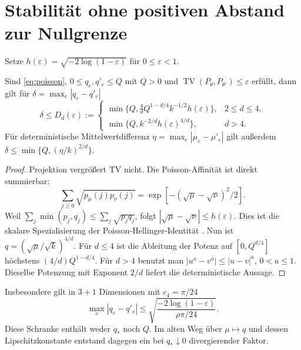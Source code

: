 \documentclass[11pt,a4paper]{article}
\newcommand{\TV}{\operatorname{TV}}\newcommand{\Pois}{\operatorname{Pois}}
\begin{document}
\section{Stabilität ohne positiven Abstand zur Nullgrenze}
Setze $h(\varepsilon)=\sqrt{-2\log(1-\varepsilon)}$ für $0\leq\varepsilon<1$.
\begin{lemma}\label{lem:null}
Sind \eqref{eq:poisson}, $0\leq q_e,q'_e\leq Q$ mit $Q>0$ und $\TV(P_\theta,P_{\theta'})\leq\varepsilon$ erfüllt, dann gilt für $\delta=\max_e|q_e-q'_e|$
\begin{equation}\label{eq:newD}
 \delta\leq D_d(\varepsilon):=
 \begin{cases}
 \min\{Q,\frac4d Q^{1-d/4}k^{-1/2}h(\varepsilon)\},&2\leq d\leq4,\\
 \min\{Q,k^{-2/d}h(\varepsilon)^{4/d}\},&d>4.
 \end{cases}
\end{equation}
Für deterministische Mittelwertdifferenz $\eta=\max_e|\mu_e-\mu'_e|$ gilt außerdem $\delta\leq\min\{Q,(\eta/k)^{2/d}\}$.
\end{lemma}
\begin{proof}
Projektion vergrößert TV nicht. Die Poisson-Affinität ist direkt summierbar:
\[
 \sum_{j\geq0}\sqrt{p_\mu(j)p_\nu(j)}
 =\exp[-(\sqrt\mu-\sqrt\nu)^2/2].
\]
Weil $\sum_j\min(p_j,q_j)\leq\sum_j\sqrt{p_jq_j}$, folgt $|\sqrt\mu-\sqrt\nu|\leq h(\varepsilon)$. Dies ist die skalare Spezialisierung der Poisson-Hellinger-Identität \cite{leskela}. Nun ist $q=(\sqrt\mu/\sqrt{k})^{4/d}$. Für $d\leq4$ ist die Ableitung der Potenz auf $[0,Q^{d/4}]$ höchstens $(4/d)Q^{1-d/4}$. Für $d>4$ benutzt man $|u^a-v^a|\leq|u-v|^a$, $0<a\leq1$. Dieselbe Potenzung mit Exponent $2/d$ liefert die deterministische Aussage.
\end{proof}

Insbesondere gilt in $3+1$ Dimensionen mit $c_4=\pi/24$
\begin{equation}\label{eq:4D}
 \max_e|q_e-q'_e|\leq\sqrt{\frac{-2\log(1-\varepsilon)}{\rho\pi/24}}.
\end{equation}
Diese Schranke enthält weder $q_*$ noch $Q$. Im alten Weg über $\mu\mapsto q$ und dessen Lipschitzkonstante entstand dagegen ein bei $q_*\downarrow0$ divergierender Faktor.
\end{document}
